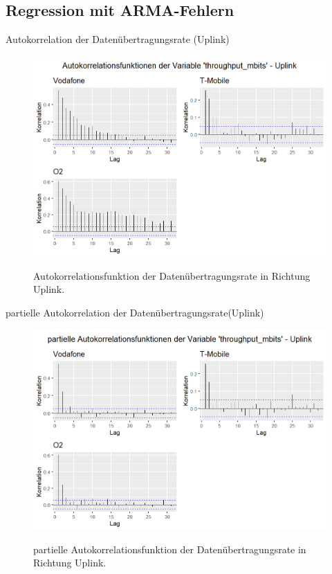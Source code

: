 \subsection{Regression mit ARMA-Fehlern}
\begin{frame}{Autokorrelation der Datenübertragungsrate (Uplink)}
	\begin{figure}
		\includegraphics[scale=0.38]{plots/arima/uplink/throughput_acf}\\
		\caption{Autokorrelationsfunktion der Datenübertragungsrate in Richtung Uplink.}
		\label{throughput_acf}
	\end{figure}
\end{frame}

\begin{frame}{partielle Autokorrelation der Datenübertragungsrate(Uplink)}
	\begin{figure}
		\includegraphics[scale=0.38]{plots/arima/uplink/throughput_pacf}\\
		\caption{partielle Autokorrelationsfunktion der Datenübertragungsrate in Richtung Uplink.}
		\label{throughput_pacf}
	\end{figure}
\end{frame}

